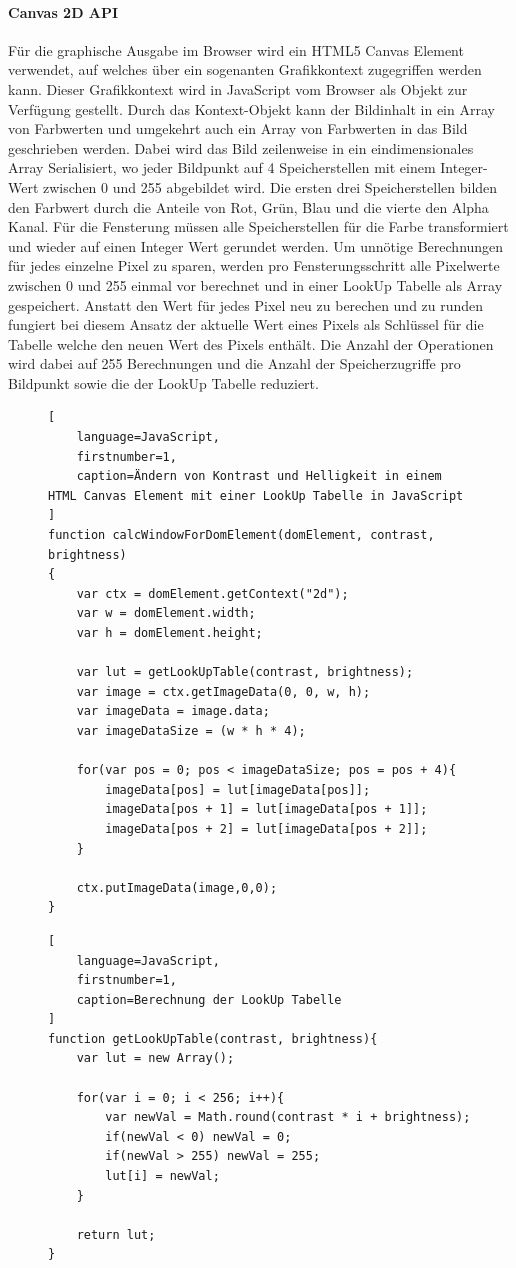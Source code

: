 \paragraph{Canvas 2D API}
Für die graphische Ausgabe im Browser wird ein HTML5 Canvas Element verwendet,
auf welches über ein sogenanten Grafikkontext zugegriffen werden kann. 
Dieser Grafikkontext wird in JavaScript vom Browser als Objekt zur Verfügung gestellt.
Durch das Kontext-Objekt kann der Bildinhalt in ein Array von Farbwerten und umgekehrt auch ein Array von Farbwerten in das Bild geschrieben werden.
Dabei wird das Bild zeilenweise in ein eindimensionales Array Serialisiert, 
wo jeder Bildpunkt auf 4 Speicherstellen mit einem Integer-Wert zwischen 0 und 255 abgebildet wird.
Die ersten drei Speicherstellen bilden den Farbwert durch die Anteile von Rot, Grün, Blau und die vierte den Alpha Kanal.
Für die Fensterung müssen alle Speicherstellen für die Farbe transformiert und wieder auf einen Integer Wert gerundet werden.
%
Um unnötige Berechnungen für jedes einzelne Pixel zu sparen, werden pro Fensterungsschritt alle Pixelwerte zwischen 0 und 255 einmal vor berechnet und in einer LookUp Tabelle als Array gespeichert.
Anstatt den Wert für jedes Pixel neu zu berechen und zu runden fungiert bei diesem Ansatz der aktuelle Wert eines Pixels als Schlüssel für die Tabelle welche den neuen Wert des Pixels enthält.
Die Anzahl der Operationen wird dabei auf 255 Berechnungen und die Anzahl der Speicherzugriffe pro Bildpunkt sowie die der LookUp Tabelle reduziert.
\begin{figure}[t]
\begin{lstlisting}[
	language=JavaScript,
	firstnumber=1,
	caption=Ändern von Kontrast und Helligkeit in einem HTML Canvas Element mit einer LookUp Tabelle in JavaScript
]
function calcWindowForDomElement(domElement, contrast, brightness)
{
    var ctx = domElement.getContext("2d");
    var w = domElement.width;
    var h = domElement.height;

    var lut = getLookUpTable(contrast, brightness);
    var image = ctx.getImageData(0, 0, w, h);
    var imageData = image.data;
    var imageDataSize = (w * h * 4);

    for(var pos = 0; pos < imageDataSize; pos = pos + 4){
        imageData[pos] = lut[imageData[pos]];
        imageData[pos + 1] = lut[imageData[pos + 1]];
        imageData[pos + 2] = lut[imageData[pos + 2]];
    }

    ctx.putImageData(image,0,0);
}
\end{lstlisting}
\end{figure}
%
\begin{figure}[t]
\begin{lstlisting}[
	language=JavaScript,
	firstnumber=1,
	caption=Berechnung der LookUp Tabelle
]
function getLookUpTable(contrast, brightness){
    var lut = new Array();

    for(var i = 0; i < 256; i++){
        var newVal = Math.round(contrast * i + brightness);
        if(newVal < 0) newVal = 0;
        if(newVal > 255) newVal = 255;
        lut[i] = newVal;
    }

    return lut;
}
\end{lstlisting}
\end{figure}

